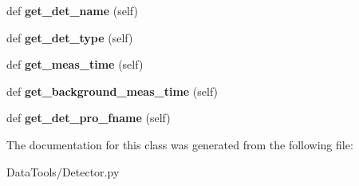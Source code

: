 \begin{DoxyCompactItemize}
def {\bfseries get\+\_\+det\+\_\+name} (self)
\item 
\mbox{\label{classMIS_1_1DataTools_1_1Detector_1_1Detector_ab315c0dd4a1d022e1a247a690f9d3694}} 
def {\bfseries get\+\_\+det\+\_\+type} (self)
\item 
\mbox{\label{classMIS_1_1DataTools_1_1Detector_1_1Detector_aec9b7e469647973723c8e272169e3d72}} 
def {\bfseries get\+\_\+meas\+\_\+time} (self)
\item 
\mbox{\label{classMIS_1_1DataTools_1_1Detector_1_1Detector_a2b39bad7f2066eba7bb1f5f50de87bfd}} 
def {\bfseries get\+\_\+background\+\_\+meas\+\_\+time} (self)
\item 
\mbox{\label{classMIS_1_1DataTools_1_1Detector_1_1Detector_a2e2764dada2e16c727239ab913176604}} 
def {\bfseries get\+\_\+det\+\_\+pro\+\_\+fname} (self)
\end{DoxyCompactItemize}


The documentation for this class was generated from the following file\+:\begin{DoxyCompactItemize}
\item 
Data\+Tools/Detector.\+py\end{DoxyCompactItemize}
